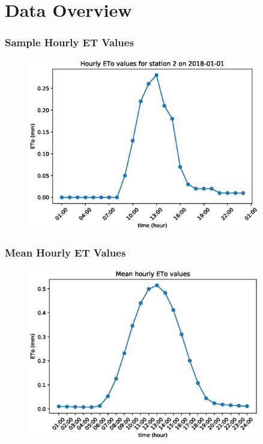\section{Data Overview}
\begin{frame}
\frametitle{Sample Hourly ET Values}
\begin{figure}
\includegraphics[width=0.9\textwidth]{images/hourly-eto-2-2018-01-01}
\end{figure}
\end{frame}

\begin{frame}
\frametitle{Mean Hourly ET Values}
\begin{figure}
\includegraphics[width=0.9\textwidth]{images/mean-of-hourly-eto-values}
\end{figure}
\end{frame}

